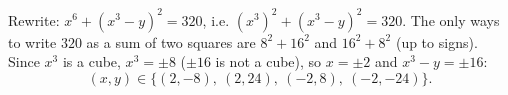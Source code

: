 Rewrite: $x^6+\left(x^3-y\right)^2=320$, i.e. $\left(x^3\right)^2+\left(x^3-y\right)^2=320$. The only ways to write $320$ as a sum of two squares are $8^2+16^2$ and $16^2+8^2$ (up to signs). Since $x^3$ is a cube, $x^3=\pm8$ ($\pm16$ is not a cube), so $x=\pm2$ and $x^3-y=\pm16$:
\[(x,y)\in\{(2,-8),\ (2,24),\ (-2,8),\ (-2,-24)\}.\]

